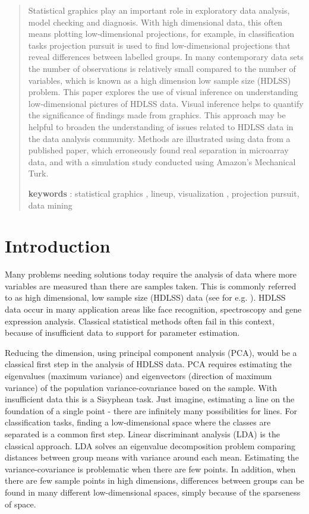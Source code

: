 \begin{abstract}
Statistical graphics play an important role in exploratory data analysis, model checking and diagnosis. With high dimensional data, this often means plotting low-dimensional projections, for example, in classification tasks projection pursuit is used to find low-dimensional projections that reveal differences between labelled groups. In many contemporary data sets the number of observations is relatively small compared to the number of variables, which is known as a high dimension low sample size (HDLSS) problem. This paper explores the use of visual inference on understanding low-dimensional pictures of HDLSS data. Visual inference helps to quantify the significance of findings made from graphics.  This approach may be helpful to broaden the understanding of issues related to HDLSS data in the data analysis community. Methods are illustrated using data from a published paper, which erroneously found real separation in microarray data, and with a simulation study conducted using Amazon's Mechanical Turk.

\textbf{keywords} : statistical graphics , lineup, visualization , projection pursuit, data mining

\end{abstract}



\section{Introduction} 

Many problems needing solutions today require the analysis of data where more variables are measured than there are samples taken. This is commonly referred to as high dimensional, low sample size (HDLSS) data (see for e.g. \cite{hall:2005}).   
HDLSS data occur in many application areas like face recognition, spectroscopy  and gene expression analysis. Classical statistical methods often fail in this context, because of insufficient data to support for parameter estimation. 

Reducing the dimension, using principal component analysis (PCA), would be a classical first step in the analysis of HDLSS data. PCA requires estimating the eigenvalues (maximum variance) and eigenvectors (direction of maximum variance) of the population variance-covariance based on the sample. With insufficient data this is a Sisyphean task. Just imagine, estimating a line on the foundation of a single point - there are infinitely many possibilities for lines. For classification tasks, finding a low-dimensional space where the classes are separated is a common first step. Linear discriminant analysis (LDA) is the classical approach. LDA solves an eigenvalue decomposition problem comparing distances between group means with variance around each mean. Estimating the variance-covariance is problematic when there are few points. In addition, when there are few sample points in high dimensions, differences between groups can be found in many different low-dimensional spaces, simply because of the sparseness of space.

